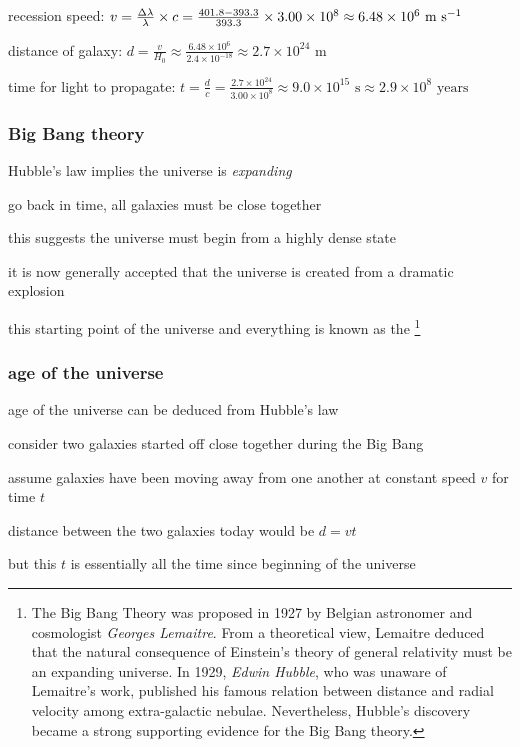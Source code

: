 \sol recession speed: $v = \frac{\Delta \lambda}{\lambda} \times c = \frac{401.8-393.3}{393.3}\times 3.00\times10^8 \approx 6.48 \times 10^6 \text{ m s$^{-1}$}$

distance of galaxy: $d = \frac{v}{H_0} \approx \frac{6.48\times10^6}{2.4\times10^{-18}} \approx 2.7 \times 10^{24} \text{ m}$

time for light to propagate: $t = \frac{d}{c} = \frac{2.7 \times 10^{24}}{3.00\times10^8} \approx 9.0\times10^{15} \text{ s} \approx 2.9\times10^{8} \text{ years}$

\subsubsection{Big Bang theory}

Hubble's law implies the universe is \emph{expanding}

go back in time, all galaxies must be close together

this suggests the universe must begin from a highly dense state

it is now generally accepted that the universe is created from a dramatic explosion

this starting point of the universe and everything is known as the \footnote{The Big Bang Theory was proposed in 1927 by Belgian astronomer and cosmologist \emph{Georges Lemaitre}. From a theoretical view, Lemaitre deduced that the natural consequence of Einstein's theory of general relativity must be an expanding universe. In 1929, \emph{Edwin Hubble}, who was unaware of Lemaitre's work, published his famous relation between distance and radial velocity among extra-galactic nebulae. Nevertheless, Hubble's discovery became a strong supporting evidence for the Big Bang theory.}

\subsubsection*{age of the universe}

age of the universe can be deduced from Hubble's law

consider two galaxies started off close together during the Big Bang

assume galaxies have been moving away from one another at constant speed $v$ for time $t$

distance between the two galaxies today would be $d=vt$

but this $t$ is essentially all the time since beginning of the universe

